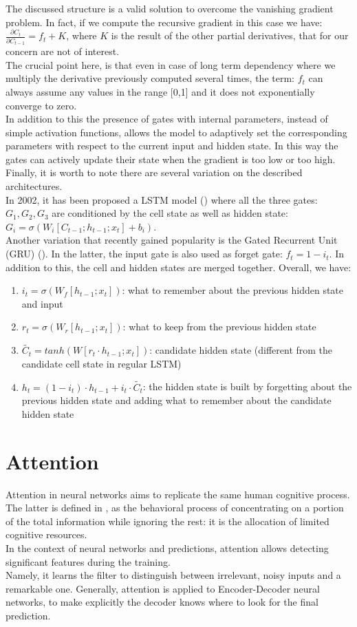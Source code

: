 \documentclass[LaM,binding=0.6cm]{sapthesis}
\begin{document}
The discussed structure is a valid solution to overcome the vanishing gradient problem. In fact, if we compute the recursive gradient in this case we have: $\frac{\partial C_t}{\partial C_{t-1}} = f_t + K$, where $K$ is the result of the other partial derivatives, that for our concern are not of interest.\\The crucial point here, is that even in case of long term dependency where we multiply the derivative previously computed several times, the term: $f_t$ can always assume any values in the range [0,1] and it does not exponentially converge to zero.\\In addition to this the presence of gates with internal parameters, instead of simple activation functions, allows the model to adaptively set the corresponding parameters with respect to the current input and hidden state. In this way the gates can actively update their state when the gradient is too low or too high.\\Finally, it is worth to note there are several variation on the described architectures.\\In 2002, it has been proposed a LSTM model (\cite{lstmv1}) where all the three gates:$G_1,G_2,G_3$ are conditioned by the cell state as well as hidden state: $G_i=\sigma(W_i[C_{t-1};h_{t-1};x_t]+b_i)$.\\Another variation that recently gained popularity is the Gated Recurrent Unit (GRU) (\cite{grupaper}). In the latter, the input gate is also used as forget gate: $f_t=1-i_t$. In addition to this, the cell and hidden states are merged together. Overall, we have:
\begin{enumerate}
\item $i_t=\sigma(W_f[h_{t-1};x_t])$: what to remember about the previous hidden state and input
\item $r_t=\sigma(W_r[h_{t-1};x_t])$: what to keep from the previous hidden state  
\item $\widetilde{C_t}=tanh(W [r_t\cdot h_{t-1};x_t])$: candidate hidden state (different from the candidate cell state in regular LSTM)
\item $h_t=(1-i_t)\cdot h_{t-1}+i_t\cdot\widetilde{C_t}$: the hidden state is built by forgetting about the previous hidden state and  adding what to remember about the candidate hidden state
\end{enumerate}
\section{Attention}
Attention in neural networks aims to replicate the same human cognitive process. The latter is defined in \cite{psy}, as the behavioral process of concentrating on a portion of the total information while ignoring the rest: it is the allocation of limited cognitive resources.\\In the context of neural networks and predictions, attention allows detecting significant features during the training.\\Namely, it learns the filter to distinguish between irrelevant, noisy inputs and a remarkable one. Generally, attention is applied to Encoder-Decoder neural networks, to make explicitly the decoder knows where to look for the final prediction.
\end{document}
